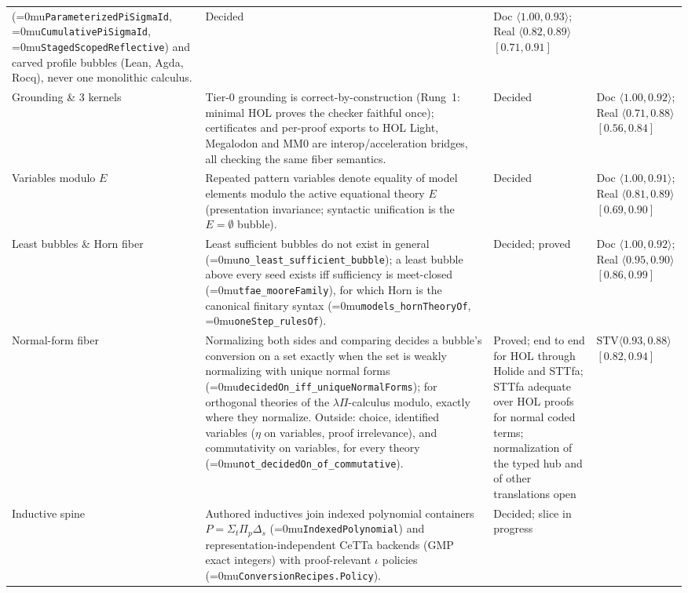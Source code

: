 \documentclass[11pt]{article}
\newcommand{\leanname}[1]{\textup{\Urlmuskip=0mu\relax\nolinkurl{#1}}}
\theoremstyle{definition}
\theoremstyle{remark}
\begin{document}
{\begin{longtable}{>{\raggedright\arraybackslash}p{2.3cm}
  >{\raggedright\arraybackslash}p{5.9cm}
  >{\raggedright\arraybackslash}p{2.3cm}
  >{\raggedright\arraybackslash}p{2.5cm}}
  (\leanname{ParameterizedPiSigmaId}, \leanname{CumulativePiSigmaId},
  \leanname{StagedScopedReflective}) and carved profile bubbles (Lean, Agda,
  Rocq), never one monolithic calculus. & Decided &
  Doc $\langle 1.00, 0.93\rangle$; Real $\langle 0.82, 0.89\rangle$ $[0.71,0.91]$\\
Grounding \& 3 kernels & Tier-0 grounding is correct-by-construction (Rung~1:
  minimal HOL proves the checker faithful once); certificates and per-proof
  exports to HOL Light, Megalodon and MM0 are interop/acceleration bridges, all
  checking the same fiber semantics. & Decided &
  Doc $\langle 1.00, 0.92\rangle$; Real $\langle 0.71, 0.88\rangle$ $[0.56,0.84]$\\
Variables modulo $E$ & Repeated pattern variables denote equality of model
  elements modulo the active equational theory $E$ (presentation invariance;
  syntactic unification is the $E = \emptyset$ bubble). & Decided &
  Doc $\langle 1.00, 0.91\rangle$; Real $\langle 0.81, 0.89\rangle$ $[0.69,0.90]$\\
Least bubbles \& Horn fiber & Least sufficient bubbles do not exist in general
  (\leanname{no_least_sufficient_bubble}); a least bubble above every seed
  exists iff sufficiency is meet-closed (\leanname{tfae_mooreFamily}), for
  which Horn is the canonical finitary syntax (\leanname{models_hornTheoryOf},
  \leanname{oneStep_rulesOf}). & Decided; proved &
  Doc $\langle 1.00, 0.92\rangle$; Real $\langle 0.95, 0.90\rangle$ $[0.86,0.99]$\\
Normal-form fiber & Normalizing both sides and comparing decides a bubble's
  conversion on a set exactly when the set is weakly normalizing with unique
  normal forms (\leanname{decidedOn_iff_uniqueNormalForms}); for orthogonal
  theories of the $\lambda\Pi$-calculus modulo, exactly where they normalize.
  Outside: choice, identified variables ($\eta$ on variables, proof
  irrelevance), and commutativity on variables, for every theory
  (\leanname{not_decidedOn_of_commutative}). & Proved; end to end for HOL through Holide and STTfa; STTfa adequate over HOL proofs for normal coded terms; normalization of the typed hub and of other translations open &
  $\mathrm{STV}\langle 0.93, 0.88\rangle$ $[0.82,0.94]$\\
Inductive spine & Authored inductives join indexed polynomial containers
  $P = \Sigma_t \Pi_p \Delta_s$ (\leanname{IndexedPolynomial}) and
  representation-independent CeTTa backends (GMP exact integers) with
  proof-relevant $\iota$ policies (\leanname{ConversionRecipes.Policy}). &
  Decided; slice in progress &

\end{longtable}}
\end{document}
